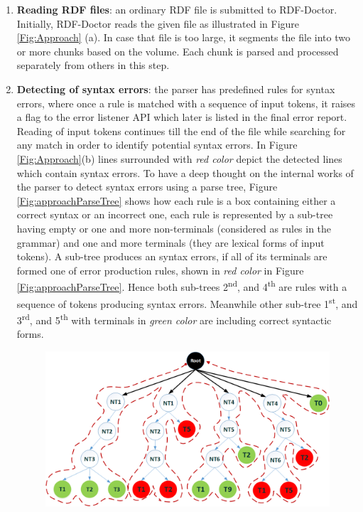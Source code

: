  \begin{enumerate}[label=(\alph*)]
\item \textbf{Reading RDF files}: an ordinary RDF file is submitted to RDF-Doctor.
Initially, RDF-Doctor reads the given file as illustrated in Figure \ref{Fig:Approach} (a). 
In case that file is too large, it segments the file into two or more chunks based on the volume. 
Each chunk is parsed and processed separately from others in this step.  
\item \textbf{Detecting of syntax errors}: the parser has predefined rules for syntax errors, where %
once a rule is matched with a sequence of input tokens, it raises a flag to the error listener API which later is listed in the final error report. 
Reading of input tokens continues till the end of the file while searching for any match in order to identify potential syntax errors. 
In {Figure \ref{Fig:Approach}}(b) lines surrounded with \emph{red color} depict the detected lines which contain syntax errors. To have a deep thought on the internal works of the parser to detect syntax errors using a parse tree, Figure \ref{Fig:approachParseTree} shows how each rule is a box containing either a correct syntax or an incorrect one, each rule is represented by a sub-tree having empty or one and more non-terminals (considered as rules in the grammar) and one and more terminals (they are lexical forms of input tokens). A sub-tree produces an syntax errors, if all of its terminals are formed one of error production rules, shown in \emph{red color} in Figure \ref{Fig:approachParseTree}. Hence both sub-trees 2\textsuperscript{nd}, and 4\textsuperscript{th} are rules with a sequence of tokens producing syntax errors.  Meanwhile other sub-tree 1\textsuperscript{st}, and 3\textsuperscript{rd}, and 5\textsuperscript{th} with terminals in \emph{green color}  are including  correct syntactic  forms.
\begin{figure}
	\centering
	  	\includegraphics[width=.8\textwidth]{images/approachParseTree.png}

\end{figure}
\end{enumerate}
